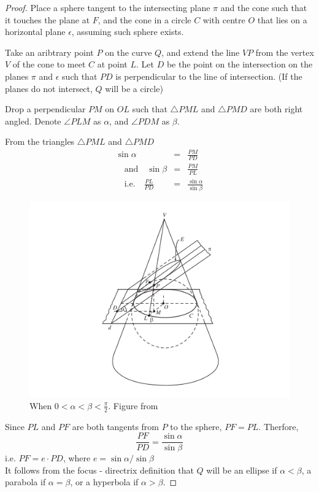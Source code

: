 \begin{proof}
  Place a sphere tangent to the intersecting plane $\pi$ and the cone such that it touches the
  plane at $F$, and the cone in a circle $C$ with centre $O$ that lies on a horizontal plane
  $\epsilon$, assuming such sphere exists.

  Take an aribtrary point $P$ on the curve $Q$, and extend the line $VP$ from the vertex $V$
  of the cone to meet $C$ at point $L$. Let $D$ be the point on the intersection on the planes
  $\pi$ and $\epsilon$ such that $PD$ is perpendicular to the line of intersection. (If the
  planes do not intersect, $Q$ will be a circle)

  Drop a perpendicular $PM$ on $OL$ such that $\triangle PML$ and $\triangle PMD$ are both
  right angled. Denote $\angle PLM$ as $\alpha$, and $\angle PDM$ as $\beta$.

  From the triangles  $\triangle PML$ and $\triangle PMD$
  \begin{eqnarray*}
    \sin{\alpha}&=&\frac{PM}{PD}\\ 
    \quad \textrm{and} \quad \sin{\beta}&=&\frac{PM}{PL}\\
    \quad \textrm{i.e.} \quad \frac{PL}{PD}&=&\frac{\sin{\alpha}}{\sin{\beta}}
  \end{eqnarray*}

  \begin{figure}[H]
    \center
    \includegraphics[width=0.85\linewidth]{pictures/dandelin.png}
    \caption{When $0<\alpha<\beta<\frac{\pi}{2}$. Figure from \cite{brannan}}
  \end{figure}

  Since $PL$ and $PF$ are both tangents from $P$ to the sphere, $PF=PL$. Therfore,
  \[\frac{PF}{PD}=\frac{\sin{\alpha}}{\sin{\beta}}\]
  i.e. $PF=e\cdot PD$, where $e=\sin{\alpha}/\sin{\beta}$\\
  It follows from the focus - directrix definition that $Q$ will be an ellipse if
  $\alpha<\beta$, a parabola if $\alpha=\beta$, or a hyperbola if $\alpha>\beta$.
\end{proof}

